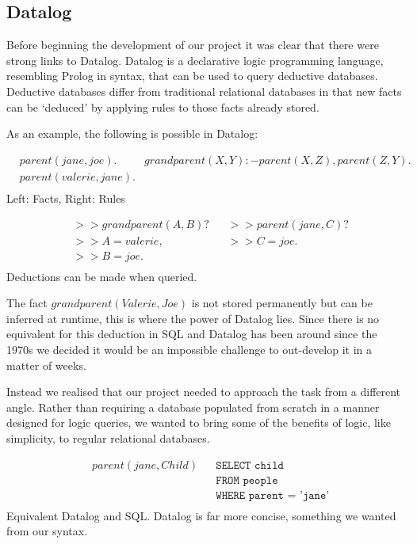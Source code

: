 \documentclass[a4paper, 11pt]{article}
\begin{document}
  \subsection{Datalog}
    Before beginning the development of our project it was clear that there were
    strong links to Datalog. Datalog is a declarative logic programming language,
    resembling Prolog in syntax, that can be used to query deductive databases.
    Deductive databases differ from traditional relational databases in that
    new facts can be `deduced' by applying rules to those facts already stored.

    As an example, the following is possible in Datalog:
    \begin{center}
      \begin{align*}
        &parent(jane, joe). & grandparent(X, Y) :- parent(X, Z), parent(Z, Y).\\
        &parent(valerie, jane). & \\
      \end{align*}
      Left: Facts, Right: Rules

      \begin{align*}
        &>> grandparent(A, B)?  & & >> parent(jane, C)? \\
        &>> A = valerie,        & & >> C = joe. \\
        &>> B = joe.            & & \\
      \end{align*}
      Deductions can be made when queried.
    \end{center}

    The fact $grandparent(Valerie, Joe)$ is not stored permanently but can be
    inferred at runtime, this is where the power of Datalog lies. Since there is no
    equivalent for this deduction in SQL and Datalog has been around since the 1970s
    we decided it would be an impossible challenge to out-develop it in a matter of
    weeks.

    Instead we realised that our project needed to approach the task from a
    different angle. Rather than requiring a database populated from scratch in a
    manner designed for logic queries, we wanted to bring some of the benefits of
    logic, like simplicity, to regular relational databases.
    \begin{center}
      \begin{align*}
        & parent(jane, Child) & & \texttt{SELECT child} \\
        &                     & & \texttt{FROM people} \\
        &                     & & \texttt{WHERE parent = 'jane'} \\
      \end{align*}
      Equivalent Datalog and SQL. Datalog is far more concise, something we wanted from our syntax.
    \end{center}
\end{document}
